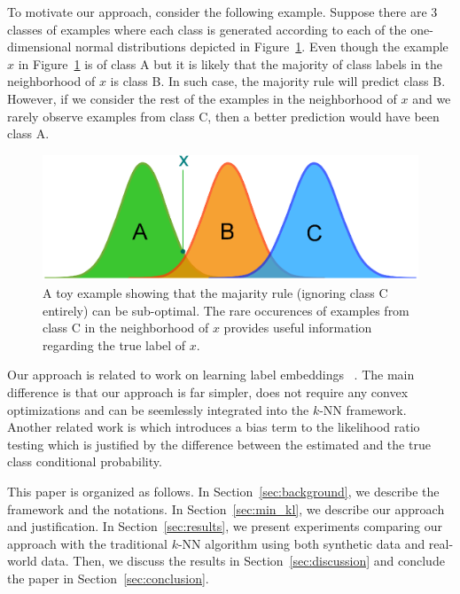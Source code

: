 \documentclass{article}
\begin{document}
To motivate our approach, consider the following example. Suppose
there are 3 classes of examples where each class is generated
according to each of the one-dimensional normal distributions depicted in
Figure~\ref{fig:toy_example}. Even though the example $x$ in
Figure~\ref{fig:toy_example} is of class A but it is likely that the
majority of class labels in the neighborhood of $x$ is class B. In
such case, the majority rule will predict class B. However, if we
consider the rest of the examples in the neighborhood of $x$ and we
rarely observe examples from class C, then a better prediction would
have been class A.

\begin{figure}[ht]
\vskip 0.2in
\begin{center}
\centerline{\includegraphics[width=\columnwidth]{figures/toy_example.eps}}
\caption{A toy example showing that the majarity rule (ignoring class
  C entirely) can be sub-optimal. The rare occurences of examples from
  class C in the neighborhood of $x$ provides useful information
  regarding the true label of $x$.}
\label{fig:toy_example}
\end{center}
\vskip -0.2in
\end{figure} 

Our approach is related to work on learning label embeddings~
\cite{Collins2009, Dietterich, Allwien-Schapire, Singer,
  Bengio2010}. The main difference is that our approach is far
simpler, does not require any convex optimizations and can be
seemlessly integrated into the $k$-NN framework. Another related work
is \cite{Bilmes} which introduces a bias term to the likelihood ratio
testing which is justified by the difference between the estimated and
the true class conditional probability.

This paper is organized as follows. In Section~\ref{sec:background},
we describe the framework and the notations. In
Section~\ref{sec:min_kl}, we describe our approach and
justification. In Section~\ref{sec:results}, we present experiments
comparing our approach with the traditional $k$-NN algorithm using
both synthetic data and real-world data. Then, we discuss the results
in Section~\ref{sec:discussion} and conclude the paper in
Section~\ref{sec:conclusion}.
\end{document}
